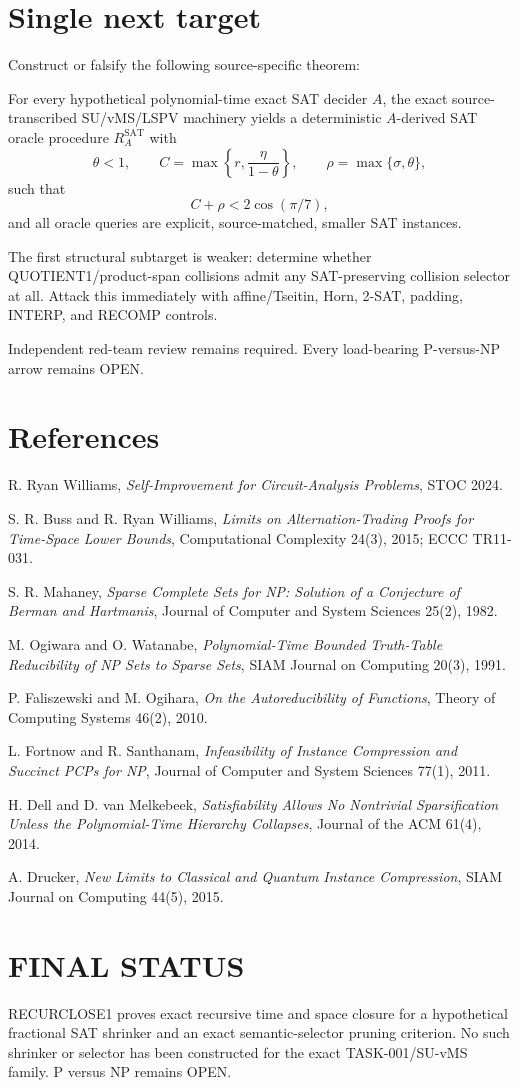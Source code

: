 \documentclass[11pt]{article}
\begin{document}
\section*{Single next target}
Construct or falsify the following source-specific theorem:

For every hypothetical polynomial-time exact SAT decider \(A\), the exact source-transcribed SU/vMS/LSPV machinery yields a deterministic \(A\)-derived SAT oracle procedure \(R_A^{\mathrm{SAT}}\) with
\[
\theta<1,
\qquad
C=\max\left\{r,\frac{\eta}{1-\theta}\right\},
\qquad
\rho=\max\{\sigma,\theta\},
\]
such that
\[
C+\rho<2\cos(\pi/7),
\]
and all oracle queries are explicit, source-matched, smaller SAT instances.

The first structural subtarget is weaker: determine whether QUOTIENT1/product-span collisions admit any SAT-preserving collision selector at all. Attack this immediately with affine/Tseitin, Horn, 2-SAT, padding, INTERP, and RECOMP controls.

Independent red-team review remains required. Every load-bearing P-versus-NP arrow remains OPEN.

\section*{References}
R. Ryan Williams, \emph{Self-Improvement for Circuit-Analysis Problems}, STOC 2024.

S. R. Buss and R. Ryan Williams, \emph{Limits on Alternation-Trading Proofs for Time-Space Lower Bounds}, Computational Complexity 24(3), 2015; ECCC TR11-031.

S. R. Mahaney, \emph{Sparse Complete Sets for NP: Solution of a Conjecture of Berman and Hartmanis}, Journal of Computer and System Sciences 25(2), 1982.

M. Ogiwara and O. Watanabe, \emph{Polynomial-Time Bounded Truth-Table Reducibility of NP Sets to Sparse Sets}, SIAM Journal on Computing 20(3), 1991.

P. Faliszewski and M. Ogihara, \emph{On the Autoreducibility of Functions}, Theory of Computing Systems 46(2), 2010.

L. Fortnow and R. Santhanam, \emph{Infeasibility of Instance Compression and Succinct PCPs for NP}, Journal of Computer and System Sciences 77(1), 2011.

H. Dell and D. van Melkebeek, \emph{Satisfiability Allows No Nontrivial Sparsification Unless the Polynomial-Time Hierarchy Collapses}, Journal of the ACM 61(4), 2014.

A. Drucker, \emph{New Limits to Classical and Quantum Instance Compression}, SIAM Journal on Computing 44(5), 2015.

\section*{FINAL STATUS}
RECURCLOSE1 proves exact recursive time and space closure for a hypothetical fractional SAT shrinker and an exact semantic-selector pruning criterion. No such shrinker or selector has been constructed for the exact TASK-001/SU-vMS family. P versus NP remains OPEN.

\end{document}
